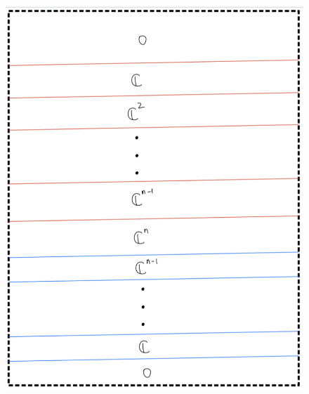 \begin{enumerate}[label = (\roman*)]
\begin{enumerate}[label = (Step \arabic*)]
\begin{figure}[H]
    \centering
    \includegraphics[scale = 0.95]{diagrams/cobord_inter/7.png}
    \caption{}
    \label{fig:your-label}
\end{figure}


\end{enumerate}
\end{enumerate}
